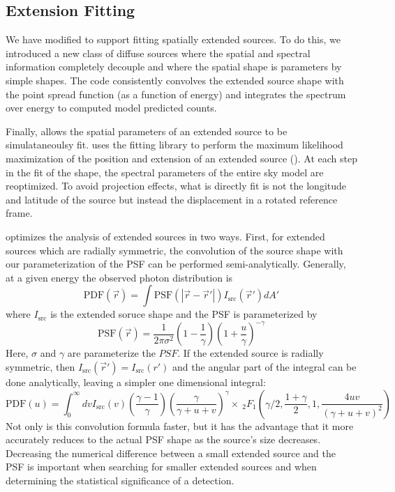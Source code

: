\documentclass[12pt,preprint]{aastex}
\newcommand{\pointlike}{\text{\em pointlike}\xspace}
\newcommand{\minuit}{\text{\em Minuit}\xspace}
\begin{document}
\subsection{Extension Fitting}
\label{extension_fitting}

We have modified \pointlike to support fitting spatially extended sources.
To do this, we introduced a new class of diffuse sources where the spatial
and spectral information completely decouple and where the spatial shape
is parameters by simple shapes.  The code consistently convolves the
extended source shape with the point spread function (as a function
of energy) and integrates the spectrum over energy to computed model
predicted counts.

Finally, \pointlike allows the spatial parameters of an extended source
to be simulataneoulsy fit. \pointlike uses the \minuit fitting library to
perform the maximum likelihood maximization of the position and extension
of an extended source (\cite{minuit_documentation}).  At each step in
the fit of the shape, the spectral parameters of the entire sky model
are reoptimized. To avoid projection effects, what is directly fit is
not the longitude and latitude of the source but instead the displacement
in a rotated reference frame.


\pointlike optimizes the analysis of extended sources in two ways.  First,
for extended sources which are radially symmetric, the convolution of
the source shape with our parameterization of the PSF can be performed
semi-analytically. Generally, at a given energy the observed photon
distribution is
\begin{equation}
  \text{PDF}(\vec r) = \int  \text{PSF}(|\vec r - \vec r'|)I_\text{src}(\vec r') d A' 
\end{equation}
where $I_\text{src}$ is the extended soruce shape and the PSF is parameterized by
\begin{equation}
  \text{PSF}(\vec r) = 
  \frac{1}{2\pi\sigma^2}
  \left(1-\frac{1}{\gamma}\right)
  \left(1+\frac{u}{\gamma}\right)^{-\gamma}
\end{equation}
Here, $\sigma$ and $\gamma$ are parameterize the $PSF$.  If the extended
source is radially symmetric, then $I_\text{src} (\vec r') = I_\text{src}
(r')$ and the angular part of the integral can be done analytically,
leaving a simpler one dimensional integral:
\begin{equation}
  \text{PDF}(u)= \int_0^\infty dv
  I_\text{src}(v) 
  \left(\frac{\gamma-1}{\gamma}\right)
  \left( \frac{\gamma}{\gamma + u + v}\right)^\gamma 
  \times ~_2F_1 \left(\gamma/2,\frac{1+\gamma}{2},1,\frac{4uv}{(\gamma+u+v)^2}\right)
\end{equation}
Not only is this convolution formula faster, but it has the advantage that
it more accurately reduces to the actual PSF shape as the source's size
decreases.  Decreasing the numerical difference between a small extended
source and the PSF is important when searching for smaller extended
sources and when determining the statistical significance of a detection.
\end{document}
